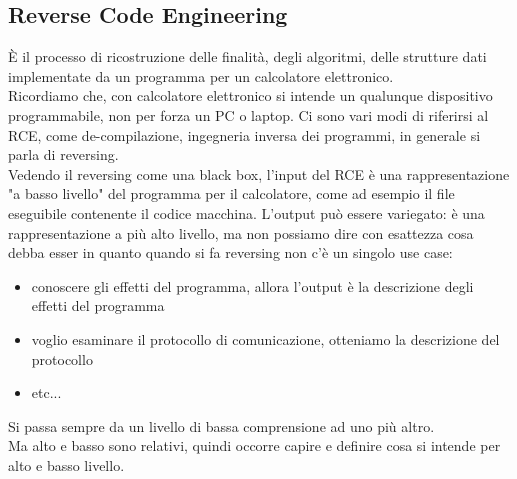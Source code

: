 \documentclass{article}
\begin{document}
\subsection{Reverse Code Engineering}
È il processo di ricostruzione delle finalità, degli algoritmi, delle strutture dati implementate da un programma per un calcolatore elettronico.\\ Ricordiamo che, con calcolatore elettronico si intende un qualunque dispositivo programmabile, non per forza un PC o laptop. Ci sono vari modi di riferirsi al RCE, come de-compilazione, ingegneria inversa dei programmi, in generale si parla di reversing.\\ Vedendo il reversing come una black box, l'input del RCE è una rappresentazione "a basso livello" del programma per il calcolatore, come ad esempio il file eseguibile contenente il codice macchina. L'output può essere variegato: è una rappresentazione a più alto livello, ma non possiamo dire con esattezza cosa debba esser in quanto quando si fa reversing non c'è un singolo use case:
\begin{itemize}
\item conoscere gli effetti del programma, allora l'output è la descrizione degli effetti del programma
\item voglio esaminare il protocollo di comunicazione, otteniamo la descrizione del protocollo
\item etc...
\end{itemize}
Si passa sempre da un livello di bassa comprensione ad uno più altro.\\ Ma alto e basso sono relativi, quindi occorre capire e definire cosa si intende per alto e basso livello.
\end{document}
